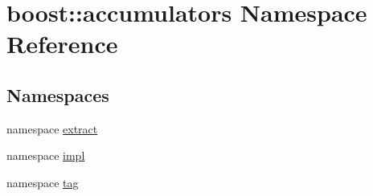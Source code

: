 \hypertarget{namespaceboost_1_1accumulators}{\section{boost\-:\-:accumulators Namespace Reference}
\label{namespaceboost_1_1accumulators}
}
\subsection*{Namespaces}
\begin{DoxyCompactItemize}
\item 
namespace \hyperlink{namespaceboost_1_1accumulators_1_1extract}{extract}
\item 
namespace \hyperlink{namespaceboost_1_1accumulators_1_1impl}{impl}
\item 
namespace \hyperlink{namespaceboost_1_1accumulators_1_1tag}{tag}
\end{DoxyCompactItemize}

